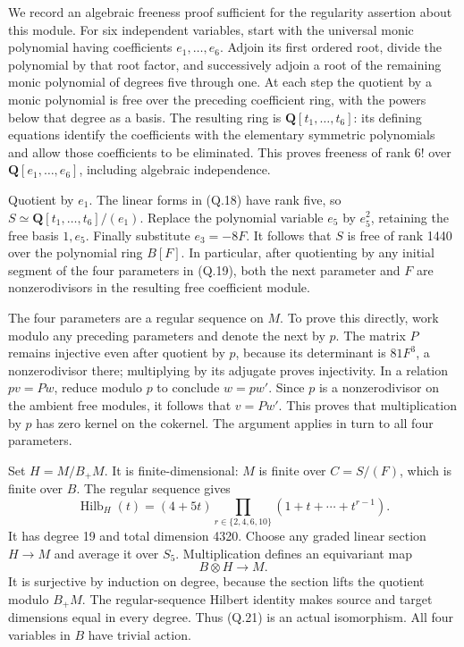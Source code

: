 \documentclass[
  10pt,
]{article}
\begin{document}
We record an algebraic freeness proof sufficient for the regularity
assertion about this module. For six independent variables, start with
the universal monic polynomial having coefficients \(e_1,\ldots,e_6\).
Adjoin its first ordered root, divide the polynomial by that root
factor, and successively adjoin a root of the remaining monic polynomial
of degrees five through one. At each step the quotient by a monic
polynomial is free over the preceding coefficient ring, with the powers
below that degree as a basis. The resulting ring is
\(\mathbf Q[t_1,\ldots,t_6]\): its defining equations identify the
coefficients with the elementary symmetric polynomials and allow those
coefficients to be eliminated. This proves freeness of rank \(6!\) over
\(\mathbf Q[e_1,\ldots,e_6]\), including algebraic independence.

Quotient by \(e_1\). The linear forms in (Q.18) have rank five, so
\(S\simeq\mathbf Q[t_1,\ldots,t_6]/(e_1)\). Replace the polynomial
variable \(e_5\) by \(e_5^2\), retaining the free basis \(1,e_5\).
Finally substitute \(e_3=-8F\). It follows that \(S\) is free of rank
1440 over the polynomial ring \(B[F]\). In particular, after quotienting
by any initial segment of the four parameters in (Q.19), both the next
parameter and \(F\) are nonzerodivisors in the resulting free
coefficient module.

The four parameters are a regular sequence on \(M\). To prove this
directly, work modulo any preceding parameters and denote the next by
\(p\). The matrix \(P\) remains injective even after quotient by \(p\),
because its determinant is \(81F^3\), a nonzerodivisor there;
multiplying by its adjugate proves injectivity. In a relation \(pv=Pw\),
reduce modulo \(p\) to conclude \(w=pw'\). Since \(p\) is a
nonzerodivisor on the ambient free modules, it follows that \(v=Pw'\).
This proves that multiplication by \(p\) has zero kernel on the
cokernel. The argument applies in turn to all four parameters.

Set \(H=M/B_+M\). It is finite-dimensional: \(M\) is finite over
\(C=S/(F)\), which is finite over \(B\). The regular sequence gives \[
\operatorname{Hilb}_H(t)
=(4+5t)\prod_{r\in\{2,4,6,10\}}(1+t+\cdots+t^{r-1}).
\tag{Q.20}
\] It has degree 19 and total dimension 4320. Choose any graded linear
section \(H\to M\) and average it over \(S_5\). Multiplication defines
an equivariant map \[
B\otimes H\longrightarrow M.
\tag{Q.21}
\] It is surjective by induction on degree, because the section lifts
the quotient modulo \(B_+M\). The regular-sequence Hilbert identity
makes source and target dimensions equal in every degree. Thus (Q.21) is
an actual isomorphism. All four variables in \(B\) have trivial action.
\end{document}
